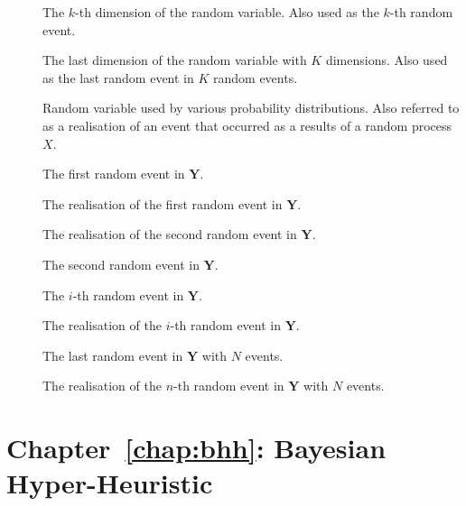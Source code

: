 \begin{description}
	\item [\parbox{2cm}{$x_{k}$}] \parbox{12.5cm}{The $k$-th dimension of the random variable. Also used as the $k$-th random event.}
	\item [\parbox{2cm}{$x_{K}$}] \parbox{12.5cm}{The last dimension of the random variable with $K$ dimensions. Also used as the last random event in $K$ random events.}
	\item [\parbox{2cm}{$x$}] \parbox{12.5cm}{Random variable used by various probability distributions. Also referred to as a realisation of an event that occurred as a results of a random process $X$.}
	\item [\parbox{2cm}{$Y_{1}$}] \parbox{12.5cm}{The first random event in $\boldsymbol{Y}$.}
	\item [\parbox{2cm}{$y_{1}$}] \parbox{12.5cm}{The realisation of the first random event in $\boldsymbol{Y}$.}
	\item [\parbox{2cm}{$y_{2}$}] \parbox{12.5cm}{The realisation of the second random event in $\boldsymbol{Y}$.}
	\item [\parbox{2cm}{$Y_{2}$}] \parbox{12.5cm}{The second random event in $\boldsymbol{Y}$.}
	\item [\parbox{2cm}{$Y_{i}$}] \parbox{12.5cm}{The $i$-th random event in $\boldsymbol{Y}$.}
	\item [\parbox{2cm}{$y_{i}$}] \parbox{12.5cm}{The realisation of the $i$-th random event in $\boldsymbol{Y}$.}
	\item [\parbox{2cm}{$Y_{N}$}] \parbox{12.5cm}{The last random event in $\boldsymbol{Y}$ with $N$ events.}
	\item [\parbox{2cm}{$y_{n}$}] \parbox{12.5cm}{The realisation of the $n$-th random event in $\boldsymbol{Y}$ with $N$ events.}
\end{description}

\section{Chapter~\ref{chap:bhh}: Bayesian Hyper-Heuristic}
\label{sec:symbols:bhh}

